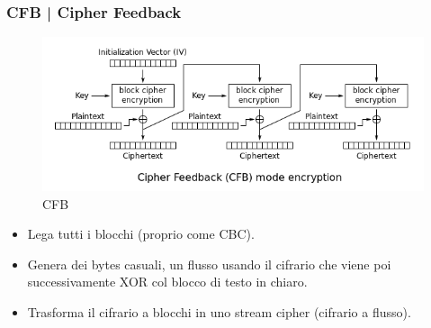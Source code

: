 


\subsubsection{CFB | Cipher Feedback}


\textsf{\small }

\begin{figure}[H]
	\centering
	\includegraphics[width=1\textwidth, height=1\textheight, keepaspectratio]{./images/aes_modes/cfb.png} %
	\caption{CFB}
	\label{fig:cfb}
\end{figure}


\begin{itemize}
	\item \textsf{\small Lega tutti i blocchi (proprio come CBC).}
	\item \textsf{\small Genera dei bytes casuali, un flusso usando il cifrario che viene poi successivamente XOR col blocco di testo in chiaro.}
	\item \textsf{\small Trasforma il cifrario a blocchi in uno stream cipher (cifrario a flusso).}
\end{itemize}

